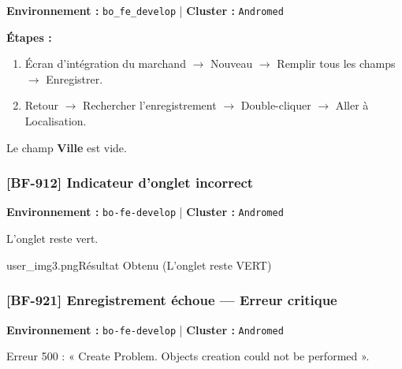 \begin{tcolorbox}[colback=white, colframe=primary, title=\textbf{Ticket Jira : BF-911}, fonttitle=\bfseries]
\textbf{Environnement :} \texttt{bo\_fe\_develop} | \textbf{Cluster :} \texttt{Andromed}

\textbf{Étapes :}
\begin{enumerate}[leftmargin=1.5em]
    \item Écran d'intégration du marchand $\rightarrow$ Nouveau $\rightarrow$ Remplir tous les champs $\rightarrow$ Enregistrer.
    \item Retour $\rightarrow$ Rechercher l'enregistrement $\rightarrow$ Double-cliquer $\rightarrow$ Aller à Localisation.
\end{enumerate}

         {Le champ \textbf{Ville} est vide.}
\end{tcolorbox}

\subsubsection{[BF-912] Indicateur d'onglet incorrect}

\begin{tcolorbox}[colback=white, colframe=primary, title=\textbf{Ticket Jira : BF-912}, fonttitle=\bfseries]
\textbf{Environnement :} \texttt{bo-fe-develop} | \textbf{Cluster :} \texttt{Andromed}

         {L'onglet reste vert.}
\end{tcolorbox}

          {user_img3.png}{Résultat Obtenu (L'onglet reste VERT)}

\subsubsection{[BF-921] Enregistrement échoue --- Erreur critique}

\begin{tcolorbox}[colback=white, colframe=primary, title=\textbf{Ticket Jira : BF-921}, fonttitle=\bfseries]
\textbf{Environnement :} \texttt{bo-fe-develop} | \textbf{Cluster :} \texttt{Andromed}

         {Erreur 500 : « Create Problem. Objects creation could not be performed ».}
\end{tcolorbox}

